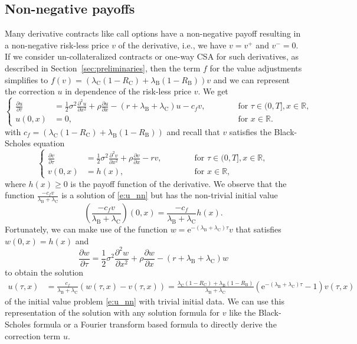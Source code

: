 \documentclass[a4paper,10pt]{article}
\newcommand{\e}{\mathrm{e}}
\newcommand{\R}{\mathbb{R}}
\newcommand{\1}{\mathbf{1}}
\begin{document}
\subsection{Non-negative payoffs}

Many derivative contracts like call options have a non-negative payoff resulting in a non-negative risk-less price $v$ of the derivative, i.e., we have $v=v^+$ and $v^-=0$. If we consider un-collateralized contracts or one-way CSA for such derivatives, as described in Section~\ref{sec:preliminaries}, then the term $f$ for the value adjustments simplifies to $f(v)=(\lambda_\text{C}(1-R_\text{C})+\lambda_\text{B}(1-R_\text{B}))v$ and we can represent the correction $u$ in dependence of the risk-less price $v$. We get
\begin{equation}\label{e:u_nn}
\left\{
\begin{aligned}
\frac{\partial u}{\partial \tau} &= \frac{1}{2}\sigma^2 \frac{\partial^2 u}{\partial x^2}+\rho\frac{\partial u}{\partial x}-(r+\lambda_\text{B}+\lambda_\text{C})u-c_fv, &&\qquad\text{ for } \tau\in(0,T], x\in\R, \\
u(0,x) &= 0, &&\qquad\text{ for } x\in\R. 
\end{aligned}
\right.
\end{equation}
with $c_f=(\lambda_\text{C}(1-R_\text{C})+\lambda_\text{B}(1-R_\text{B}))$ and recall that $v$ satisfies the Black-Scholes equation
\begin{equation}
\left\{
\begin{aligned}
\frac{\partial v}{\partial \tau} &= \frac{1}{2}\sigma^2 \frac{\partial^2 v}{\partial x^2}+\rho\frac{\partial v}{\partial x}-rv, &&\qquad\text{ for } \tau\in(0,T], x\in\R, \\
v(0,x) &= h(x), &&\qquad\text{ for } x\in\R, 
\end{aligned}
\right.
\end{equation}
where $h(x)\geq0$ is the payoff function of the derivative. We observe that the function $\frac{-c_fv}{\lambda_\text{B}+\lambda_\text{C}}$ is a solution of \eqref{e:u_nn} but has the non-trivial initial value
$$
\left(\frac{-c_fv}{\lambda_\text{B}+\lambda_\text{C}}\right)(0,x)=\frac{-c_f}{\lambda_\text{B}+\lambda_\text{C}}h(x).
$$
Fortunately, we can make use of the function $w=\e^{-(\lambda_\text{B}+\lambda_\text{C})\tau}v$ that satisfies $w(0,x)=h(x)$ and
\begin{equation*}
\frac{\partial w}{\partial \tau} = \frac{1}{2}\sigma^2 \frac{\partial^2 w}{\partial x^2}+\rho\frac{\partial w}{\partial x}-(r+\lambda_\text{B}+\lambda_\text{C})w
\end{equation*}
to obtain the solution
\begin{align*}
u(\tau,x) &= \frac{c_f}{\lambda_\text{B}+\lambda_\text{C}}(w(\tau,x)-v(\tau,x))
= \frac{\lambda_\text{C}(1-R_\text{C})+\lambda_\text{B}(1-R_\text{B})}{\lambda_\text{B}+\lambda_\text{C}}\left(\e^{-(\lambda_\text{B}+\lambda_\text{C})\tau}-1\right)v(\tau,x)
\end{align*}
of the initial value problem \eqref{e:u_nn} with trivial initial data. We can use this representation of the solution with any solution formula for $v$ like the Black-Scholes formula or a Fourier transform based formula to directly derive the correction term $u$.
\end{document}
